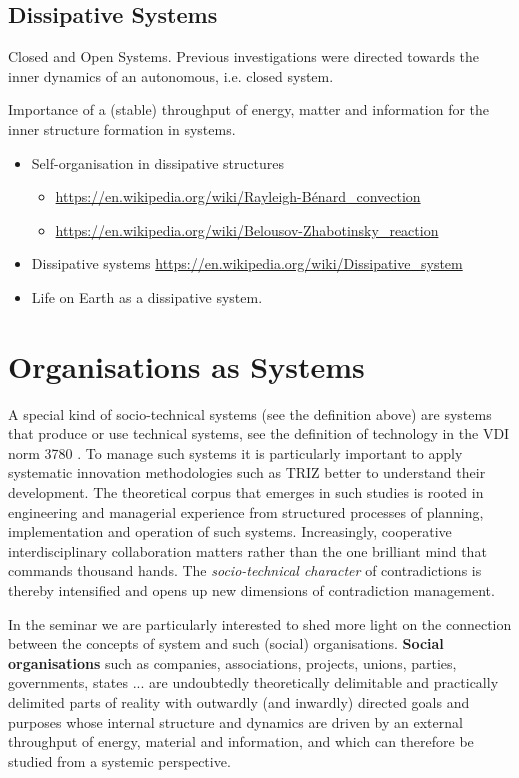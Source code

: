 \documentclass[11pt,a4paper]{article}
\begin{document}
\subsection{Dissipative Systems}

Closed and Open Systems. Previous investigations were directed towards the
inner dynamics of an autonomous, i.e. closed system.

Importance of a (stable) throughput of energy, matter and information for the
inner structure formation in systems.

\begin{itemize}
\item Self-organisation in dissipative structures
  \begin{itemize}
  \item \url{https://en.wikipedia.org/wiki/Rayleigh-Bénard_convection}
  \item \url{https://en.wikipedia.org/wiki/Belousov-Zhabotinsky_reaction}
  \end{itemize}
\item Dissipative systems
  \url{https://en.wikipedia.org/wiki/Dissipative_system} 
\item Life on Earth as a dissipative system.
\end{itemize}

\section{Organisations as Systems}

A special kind of socio-technical systems (see the definition above) are
systems that produce or use technical systems, see the definition of
technology in the VDI norm 3780 \cite{VDI}.  To manage such systems it is
particularly important to apply systematic innovation methodologies such as
TRIZ better to understand their development.  The theoretical corpus that
emerges in such studies is rooted in engineering and managerial experience
from structured processes of planning, implementation and operation of such
systems. Increasingly, cooperative interdisciplinary collaboration matters
rather than the one brilliant mind that commands thousand hands. The
\emph{socio-technical character} of contradictions is thereby intensified and
opens up new dimensions of contradiction management.

In the seminar we are particularly interested to shed more light on the
connection between the concepts of system and such (social) organisations.
\textbf{Social organisations} such as companies, associations, projects,
unions, parties, governments, states ... are undoubtedly theoretically
delimitable and practically delimited parts of reality with outwardly (and
inwardly) directed goals and purposes whose internal structure and dynamics
are driven by an external throughput of energy, material and information, and
which can therefore be studied from a systemic perspective.
\end{document}
